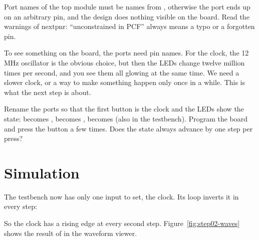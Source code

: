 \begin{pitfall}
Port names of the top module must be names from ,
otherwise the port ends up on an arbitrary pin, and the design does nothing
visible on the board. Read the warnings of nextpnr: ``unconstrained in PCF''
always means a typo or a forgotten pin.
\end{pitfall}

To see something on the board, the ports need pin names. For the clock, the
12\,MHz oscillator  is the obvious choice, but then the LEDs change
twelve million times per second, and you see them all glowing at the same time.
We need a slower clock, or a way to make something happen only once in a while.
This is what the next step is about.

\begin{exercise}
\label{ex:step02-button}
Rename the ports so that the first button is the clock and the LEDs show the
state:  becomes ,  becomes ,  becomes
 (also in the testbench). Program the board and press the button a few
times. Does the state always advance by one step per press?
\end{exercise}

\section{Simulation}
\label{sec:step02-sim}

The testbench now has only one input to set, the clock. Its loop inverts it in
every step:


So the clock has a rising edge at every second step. Figure~\ref{fig:step02-waves}
shows the result of  in the waveform viewer.

